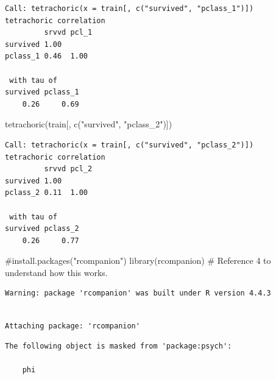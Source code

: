 \documentclass[
  letterpaper,
  DIV=11,
  numbers=noendperiod]{scrartcl}
\newenvironment{Shaded}{\begin{snugshade}}{\end{snugshade}}
\newcommand{\CommentTok}[1]{\textcolor[rgb]{0.37,0.37,0.37}{#1}}
\newcommand{\FunctionTok}[1]{\textcolor[rgb]{0.28,0.35,0.67}{#1}}
\newcommand{\NormalTok}[1]{\textcolor[rgb]{0.00,0.23,0.31}{#1}}
\newcommand{\SpecialCharTok}[1]{\textcolor[rgb]{0.37,0.37,0.37}{#1}}
\newcommand{\StringTok}[1]{\textcolor[rgb]{0.13,0.47,0.30}{#1}}
\begin{document}
\begin{verbatim}
Call: tetrachoric(x = train[, c("survived", "pclass_1")])
tetrachoric correlation 
         srvvd pcl_1
survived 1.00       
pclass_1 0.46  1.00 

 with tau of 
survived pclass_1 
    0.26     0.69 
\end{verbatim}

\begin{Shaded}
\begin{Highlighting}[]
\FunctionTok{tetrachoric}\NormalTok{(train[, }\FunctionTok{c}\NormalTok{(}\StringTok{"survived"}\NormalTok{, }\StringTok{"pclass\_2"}\NormalTok{)])}
\end{Highlighting}
\end{Shaded}

\begin{verbatim}
Call: tetrachoric(x = train[, c("survived", "pclass_2")])
tetrachoric correlation 
         srvvd pcl_2
survived 1.00       
pclass_2 0.11  1.00 

 with tau of 
survived pclass_2 
    0.26     0.77 
\end{verbatim}

\begin{Shaded}
\begin{Highlighting}[]
\CommentTok{\#install.packages("rcompanion")}
\FunctionTok{library}\NormalTok{(rcompanion) }\CommentTok{\# Reference 4 to understand how this works.}
\end{Highlighting}
\end{Shaded}

\begin{verbatim}
Warning: package 'rcompanion' was built under R version 4.4.3
\end{verbatim}

\begin{verbatim}

Attaching package: 'rcompanion'
\end{verbatim}

\begin{verbatim}
The following object is masked from 'package:psych':

    phi
\end{verbatim}

\begin{Shaded}
\end{Shaded}
\end{document}
